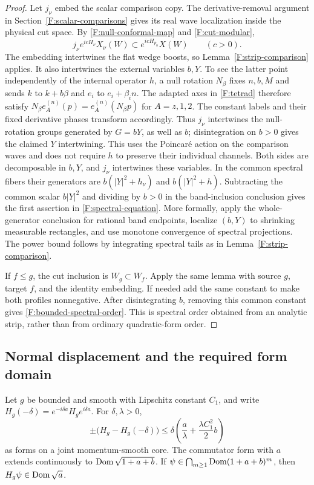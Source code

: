 \begin{proof}
Let $j_\nu$ embed the scalar comparison copy. The derivative-removal
argument in Section~\ref{F:scalar-comparisons} gives its real wave
localization inside the physical cut space. By
\eqref{F:null-conformal-map} and \eqref{F:cut-modular},
\[
 j_\nu e^{icH_\nu}X_\nu(W)
       \subset e^{icH_{p_0}}X(W)\qquad(c>0).
\]
The embedding intertwines the flat wedge boosts, so
Lemma~\ref{F:strip-comparison} applies. It also intertwines the
external variables $b,Y$. To see the latter point independently of
the internal operator $h$, a null rotation $N_\beta$ fixes $n,b,M$
and sends $k$ to $k+b\beta$ and $e_i$ to $e_i+\beta_i n$.
The adapted axes in \eqref{F:tetrad} therefore satisfy
$N_\beta e_A^{(n)}(p)=e_A^{(n)}(N_\beta p)$ for $A=z,1,2$.
The constant labels and their fixed derivative phases transform
accordingly. Thus $j_\nu$ intertwines the null-rotation groups
generated by $G=bY$, as well as $b$; disintegration on $b>0$
gives the claimed $Y$ intertwining. This uses the Poincar\'e action
on the comparison waves and does not require $h$ to preserve their
individual channels. Both sides are decomposable in
$b,Y$, and $j_\nu$ intertwines these variables. In the common spectral
fibers their generators are
$b(|Y|^2+h_\nu)$ and $b(|Y|^2+h)$. Subtracting the common scalar
$b|Y|^2$ and dividing by $b>0$ in the band-inclusion conclusion gives
the first assertion in \eqref{F:spectral-equation}. More formally,
apply the whole-generator conclusion for rational band endpoints,
localize $(b,Y)$ to shrinking measurable rectangles, and use monotone
convergence of spectral projections. The power bound follows by
integrating spectral tails as in Lemma~\ref{F:strip-comparison}.

If $f\le g$, the cut inclusion is $W_g\subset W_f$. Apply the same
lemma with source $g$, target $f$, and the identity embedding. If needed
add the same constant to make both profiles nonnegative. After
disintegrating $b$, removing this common constant gives
\eqref{F:bounded-spectral-order}. This is spectral order obtained from
an analytic strip, rather than from ordinary quadratic-form order.
\end{proof}

\subsection{Normal displacement and the required form domain}

\begin{lemma}\label{F:lipschitz-form}
Let $g$ be bounded and smooth with Lipschitz constant $C_1$, and write
$H_g(-\delta)=e^{-i\delta a}H_g e^{i\delta a}$. For $\delta,\lambda>0$,
\begin{equation}\label{F:normal-displacement}
 \pm\bigl(H_g-H_g(-\delta)\bigr)
 \le\delta\left(\frac a\lambda+\frac{\lambda C_1^2}2 b\right)
\end{equation}
as forms on a joint momentum-smooth core. The commutator form with
$a$ extends continuously to $\operatorname{Dom}\sqrt{1+a+b}$. If
$\psi\in\bigcap_{m\ge1}\operatorname{Dom}(1+a+b)^m$, then
$H_g\psi\in\operatorname{Dom}\sqrt a$.
\end{lemma}

